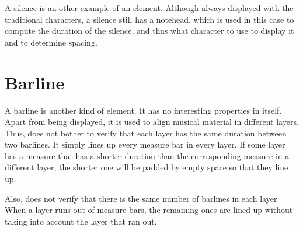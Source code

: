 A silence is an other example of an element.  Although always
displayed with the traditional characters, a silence still has a
notehead, which is used in this case to compute the duration of the
silence, and thus what character to use to display it and to determine
spacing. 

\section{Barline}

A barline is another kind of element.  It has no interesting
properties in itself.  Apart from being displayed, it is used to align
musical material in different layers.  Thus, \sysname{} does not bother to
verify that each layer has the same duration between two barlines.
It simply lines up every measure bar in every layer.  If some
layer has a measure that has a shorter duration than the corresponding
measure in a different layer, the shorter one will be padded by empty
space so that they line up. 

Also, \sysname{} does not verify that there is the same number of barlines
in each layer.  When a layer runs out of measure bars, the remaining
ones are lined up without taking into account the layer that ran out.
